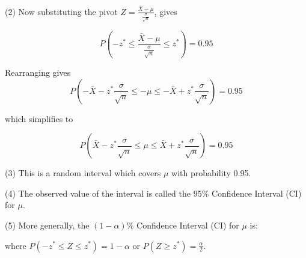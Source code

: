 \documentclass[t,xcolor=pdftex,dvipsnames,table]{beamer}
\begin{document}
\begin{frame}[fragile]{}

(2) Now substituting the pivot 
$Z = \frac{ \bar{X} - \mu }{ \frac{\sigma}{\sqrt{n}} }$, gives

\[ P(-z^{*} \leq \frac{ \bar{X} - \mu }{ \frac{\sigma}{\sqrt{n}} } \leq z^{*}) = 0.95 \]

Rearranging gives
\[ P( -\bar{X} -z^{*} \frac{\sigma}{\sqrt{n}}  \leq        -\mu         \leq  -\bar{X} + z^{*} \frac{\sigma}{\sqrt{n}}) = 0.95 \]

which simplifies to

\[ P( \bar{X} -z^{*} \frac{\sigma}{\sqrt{n}}  \leq  \mu  \leq  \bar{X} + z^{*} \frac{\sigma}{\sqrt{n}}) = 0.95 \]
\end{frame}

\begin{frame}[fragile]{}
(3) This is a random interval which covers $\mu$ with probability 0.95. 

\vspace{.5cm}
\begin{center}
\end{center}



\vspace{.5cm}
(4) The observed value of the interval is called the 95\% Confidence Interval (CI) for $\mu$.

\vspace{.5cm}
\begin{center}
\end{center}

(5) More generally, the $(1-\alpha)$\% Confidence Interval (CI) for $\mu$ is:

\vspace{.5cm}
\begin{center}
\end{center}
where $P(-z^{*} \leq Z \leq z^{*}) = 1-\alpha$ or
$P(Z \geq z^{*}) = \frac{\alpha}{2}$.


\end{frame}
\end{document}
